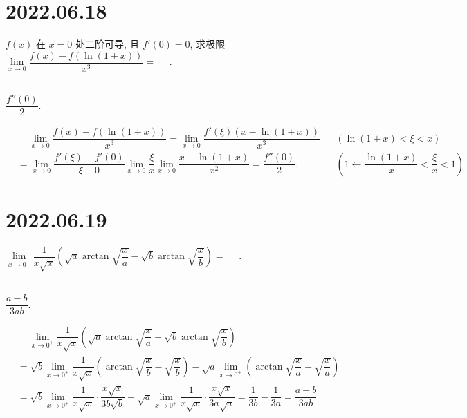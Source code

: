 \documentclass[lang=cn,12pt]{elegantbook}
\begin{document}
\section*{2022.06.18}

$f(x)$ 在 $x = 0$ 处二阶可导, 且 $f'(0)= 0$, 求极限 $
\lim\limits_{x \to 0} \dfrac{
  f(x) - f(\ln (1+x))}{x^3} = \_\_\_\_.$
\\ \\

\begin{solution}
  $\dfrac{f''(0)}{2}.$

  $\begin{aligned}
  &\quad\  \lim\limits_{x \to 0} \dfrac{
    f(x) - f(\ln (1+x))}{x^3}
  = \lim\limits_{x \to 0} \dfrac{
    f'(\xi)(x-\ln(1+x))}{x^3} && (\ln(1+x) < \xi < x)\\
  &= \lim\limits_{x \to 0} \dfrac{
    f'(\xi)-f'(0)}{\xi-0} \lim\limits_{x \to 0} \dfrac{
      \xi}{x}  \lim\limits_{x \to 0} \dfrac{
        x-\ln(1+x)}{x^2} 
  = \dfrac{f''(0)}{2}. && \left(1\gets \dfrac{\ln(1+x)}{x} <
    \dfrac{\xi}{x} < 1\right)
  \end{aligned}
  $
\end{solution}

\section*{2022.06.19}

$\lim\limits_{x \to 0^{+}} \dfrac{
  1}{x\sqrt{x}}\left(\sqrt{a}\arctan \sqrt{\dfrac{x}{a}} - 
    \sqrt{b}\arctan \sqrt{\dfrac{x}{b}}\right) = \_\_\_\_.$
\\ \\

\begin{solution}
  $\dfrac{a-b}{3ab}.$

  $\begin{aligned}
  &\quad \ \lim\limits_{x \to 0^{+}} \dfrac{
    1}{x\sqrt{x}}\left(\sqrt{a}\arctan \sqrt{\dfrac{x}{a}} - 
      \sqrt{b}\arctan \sqrt{\dfrac{x}{b}}\right)\\
  &= \sqrt{b} \lim\limits_{x \to 0^{+}}\dfrac{1}{x\sqrt{x}}
    \left(\arctan \sqrt{\dfrac{x}{b}} - \sqrt{\dfrac{x}{b}} \right) 
    - \sqrt{a} \lim\limits_{x \to 0^{+}} \left(\arctan \sqrt{\dfrac{x}{a}} - 
    \sqrt{\dfrac{x}{a}} \right)
    \\
  &= \sqrt{b} \lim\limits_{x \to 0^{+}}\dfrac{1}{x\sqrt{x}}\cdot 
    \dfrac{x\sqrt{x}}{3b\sqrt{b}} -
    \sqrt{a} \lim\limits_{x \to 0^{+}}\dfrac{1}{x\sqrt{x}}\cdot 
    \dfrac{x\sqrt{x}}{3a\sqrt{a}}
  = \dfrac{1}{3b} - \dfrac{1}{3a} = \dfrac{a-b}{3ab}
  \end{aligned}
  $
\end{solution}
\end{document}
